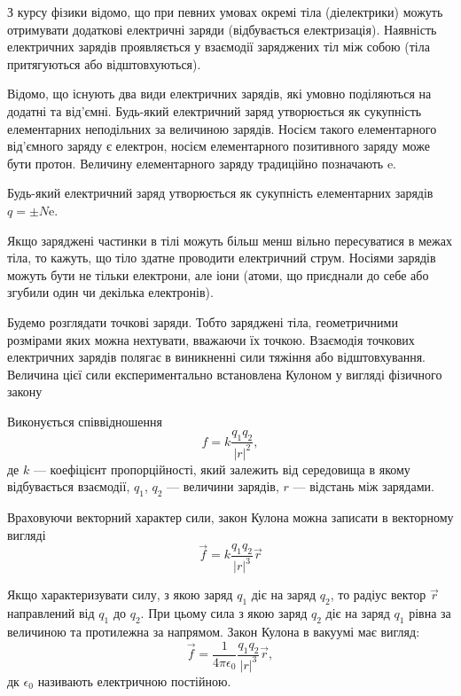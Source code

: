 З курсу фізики відомо, що при певних умовах окремі тіла (діелектрики) можуть отримувати додаткові електричні заряди (відбувається електризація). Наявність електричних зарядів проявляється у взаємодії заряджених тіл між собою (тіла притягуються або відштовхуються). \medskip

Відомо, що існують два види електричних зарядів, які умовно поділяються на додатні та від'ємні. Будь-який електричний заряд утворюється як сукупність елементарних неподільних за величиною зарядів. Носієм такого елементарного від'ємного заряду є електрон, носієм елементарного позитивного заряду може бути протон. Величину елементарного заряду традиційно позначають $\mathrm{e}$. \medskip

Будь-який електричний заряд утворюється як сукупність елементарних зарядів $q = \pm N \mathrm{e}$. \medskip

Якщо заряджені частинки в тілі можуть більш менш вільно пересуватися в межах тіла, то кажуть, що тіло здатне проводити електричний струм. Носіями зарядів можуть бути не тільки електрони, але іони (атоми, що приєднали до себе або згубили один чи декілька електронів). \medskip

Будемо розглядати точкові заряди. Тобто заряджені тіла, геометричними розмірами яких можна нехтувати, вважаючи їх точкою. Взаємодія точкових електричних зарядів полягає в виникненні сили тяжіння або відштовхування. Величина цієї сили експериментально встановлена Кулоном у вигляді фізичного закону
\begin{law}[Кулона]
	Виконується співвідношення
	\begin{equation}
		f = k \frac{q_1 q_2}{|r|^2},
	\end{equation}
	де  $k$ --- коефіцієнт пропорційності, який залежить від середовища в якому відбувається взаємодії, $q_1$, $q_2$ --- величини зарядів, $r$ --- відстань між зарядами.
\end{law}

Враховуючи векторний характер сили, закон Кулона можна записати в векторному вигляді
\begin{equation}
	\vec f = k \frac{q_1 q_2}{|r|^3} \vec r
\end{equation}

Якщо характеризувати силу, з якою заряд $q_1$ діє на заряд $q_2$, то радіус вектор $\vec r$ направлений від $q_1$ до $q_2$. При цьому сила з якою заряд $q_2$ діє на заряд $q_1$ рівна за величиною та протилежна за напрямом. Закон Кулона в вакуумі має вигляд:
\begin{equation}
	\vec f = \frac{1}{4 \pi \epsilon_0} \frac{q_1q_2}{|r|^3} \vec r,
\end{equation}
дк $\epsilon_0$ називають електричною постійною.


